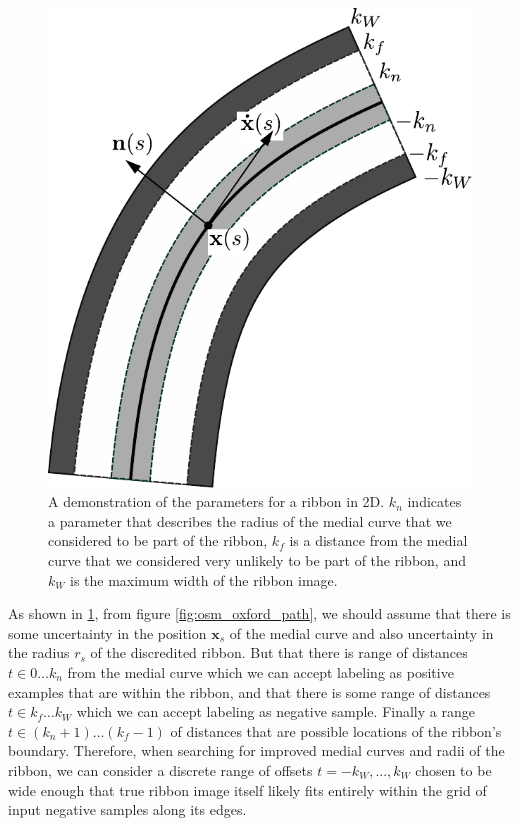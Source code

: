 \begin{figure}
    \centering
    \includegraphics[width=\textwidth]{Figures/sw-figure.pdf}
    \caption[2D Ribbon Image]{A demonstration of the parameters for a ribbon in 2D. $k_n$ indicates a parameter that describes the radius of the medial curve that we considered to be part of the ribbon, $k_f$ is a distance from the medial curve that we considered very unlikely to be part of the ribbon, and $k_W$ is the maximum width of the ribbon image.}
    \label{fig:2d_ribbon}
\end{figure}

As shown in \ref{fig:2d_ribbon}, from figure \ref{fig:osm_oxford_path}, we should assume that there is some uncertainty in the position $\mathbf{x}_s$ of the medial curve and also uncertainty in the radius $r_s$ of the discredited ribbon. 
But that there is range of distances $t \in 0\dots k_n$ from the medial curve which we can accept labeling as positive examples that are within the ribbon, and that there is some range of distances $t \in k_f\dots k_W$ which we can accept labeling as negative sample. 
Finally a range $t\in (k_n+1)...(k_f-1)$ of distances that are possible locations of the ribbon's boundary.
Therefore, when searching for improved medial curves and radii of the ribbon, we can consider a discrete range of offsets $t=-k_W,..., k_W$ chosen to be wide enough that true ribbon image itself likely fits entirely within the grid of input negative samples along its edges.  

